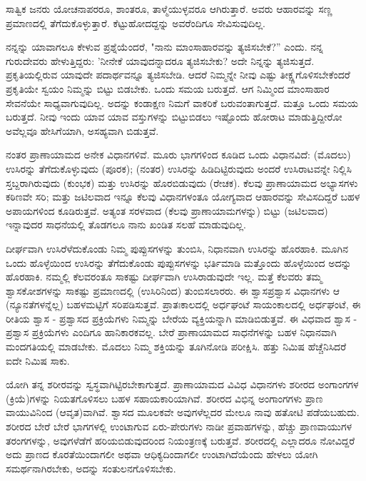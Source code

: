 ಸಾತ್ವಿಕ ಜನರು ಯೋಚನಾಪರರೂ, ಶಾಂತರೂ, ತಾಳ್ಮೆಯುಳ್ಳವರೂ ಆಗಿರುತ್ತಾರೆ. ಅವರು ಆಹಾರವನ್ನು ಸಣ್ಣ ಪ್ರಮಾಣದಲ್ಲಿ ತೆಗೆದುಕೊಳ್ಳುತ್ತಾರೆ. ಕೆಟ್ಟುಹೋದದ್ದನ್ನು ಅವರೆಂದಿಗೂ ಸೇವಿಸುವುದಿಲ್ಲ.

ನನ್ನನ್ನು ಯಾವಾಗಲೂ ಕೇಳುವ ಪ್ರಶ್ನೆಯೆಂದರೆ, "ನಾನು ಮಾಂಸಾಹಾರವನ್ನು ತ್ಯಜಿಸಬೇಕೆ?'' ಎಂದು. ನನ್ನ ಗುರುದೇವರು ಹೇಳುತ್ತಿದ್ದರು: 'ನೀನೇಕೆ ಯಾವುದನ್ನಾದರೂ ತ್ಯಜಿಸಬೇಕು? ಅದೇ ನಿನ್ನನ್ನು ತ್ಯಜಿಸುತ್ತದೆ. ಪ್ರಕೃತಿಯಲ್ಲಿರುವ ಯಾವುದೇ ಪದಾರ್ಥವನ್ನೂ ತ್ಯಜಿಸಬೇಡಿ. ಆದರೆ ನಿಮ್ಮನ್ನೇ ನೀವು ಎಷ್ಟು ತೀಕ್ಷ್ಣಗೊಳಿಸಬೇಕೆಂದರೆ ಪ್ರಕೃತಿಯೇ ಸ್ವಯಂ ನಿಮ್ಮನ್ನು ಬಿಟ್ಟು ಬಿಡಬೇಕು. ಒಂದು ಸಮಯ ಬರುತ್ತದೆ. ಆಗ ನಿಮ್ಮಿಂದ ಮಾಂಸಾಹಾರ ಸೇವನೆಯೇ ಸಾಧ್ಯವಾಗುವುದಿಲ್ಲ. ಅದನ್ನು ಕಂಡಾಕ್ಷಣ ನಿಮಗೆ ವಾಕರಿಕೆ ಬರುವಂತಾಗುತ್ತದೆ. ಮತ್ತೂ ಒಂದು ಸಮಯ ಬರುತ್ತದೆ. ನೀವು ಇಂದು ಯಾವ ಯಾವ ವಸ್ತುಗಳನ್ನು ಬಿಟ್ಟುಬಿಡಲು ಇಷ್ಟೊಂದು ಹೋರಾಟ ಮಾಡುತ್ತಿದ್ದೀರೋ ಅವೆಲ್ಲವೂ ಹೇಸಿಗೆಯಾಗಿ, ಅಸಹ್ಯವಾಗಿ ಬಿಡುತ್ತವೆ.

ನಂತರ ಪ್ರಾಣಾಯಾಮದ ಅನೇಕ ವಿಧಾನಗಳಿವೆ. ಮೂರು ಭಾಗಗಳಿಂದ ಕೂಡಿದ ಒಂದು ವಿಧಾನವಿದೆ: (ಮೊದಲು) ಉಸಿರನ್ನು ತೆಗೆದುಕೊಳ್ಳುವುದು (ಪೂರಕ); (ನಂತರ) ಉಸಿರನ್ನು ಹಿಡಿದಿಟ್ಟಿರುವುದು ಅಂದರೆ ಉಸಿರಾಟವನ್ನೇ ನಿಲ್ಲಿಸಿ ಸ್ತಬ್ದರಾಗಿರುವುದು (ಕುಂಭಕ) ಮತ್ತು ಉಸಿರನ್ನು ಹೊರಬಿಡುವುದು (ರೇಚಕ). ಕೆಲವು ಪ್ರಾಣಾಯಾಮದ ಅಭ್ಯಾಸಗಳು ಕಠಿಣವೇ ಸರಿ; ಮತ್ತು ಜಟಿಲವಾದ ಇನ್ನೂ ಕೆಲವು ವಿಧಾನಗಳಂತೂ ಯೋಗ್ಯವಾದ ಆಹಾರವನ್ನು ಸೇವಿಸದಿದ್ದರೆ ಬಹಳ ಅಪಾಯಗಳಿಂದ ಕೂಡಿರುತ್ತವೆ. ಅತ್ಯಂತ ಸರಳವಾದ (ಕೆಲವು ಪ್ರಾಣಾಯಾಮಗಳನ್ನು) ಬಿಟ್ಟು (ಜಟಿಲವಾದ) ಇನ್ನಾವುದರ ಸಾಧನೆಯಲ್ಲಿ ತೊಡಗಲೂ ನಾನು ಖಂಡಿತ ಸಲಹೆ ಮಾಡುವುದಿಲ್ಲ.

ದೀರ್ಘವಾಗಿ ಉಸಿರೆಳೆದುಕೊಂಡು ನಿಮ್ಮ ಪುಪ್ಪುಸಗಳನ್ನು ತುಂಬಿಸಿ, ನಿಧಾನವಾಗಿ ಉಸಿರನ್ನು ಹೊರಹಾಕಿ. ಮೂಗಿನ ಒಂದು ಹೊಳ್ಳೆಯಿಂದ ಉಸಿರನ್ನು ತೆಗೆದುಕೊಂಡು ಪುಪ್ಪುಸಗಳನ್ನು ಭರ್ತಿಮಾಡಿ ಮತ್ತೊಂದು ಹೊಳ್ಳೆಯಿಂದ ಅದನ್ನು ಹೊರಹಾಕಿ. ನಮ್ಮಲ್ಲಿ ಕೆಲವರಂತೂ ಸಾಕಷ್ಟು ದೀರ್ಘವಾಗಿ ಉಸಿರಾಡುವುದೇ ಇಲ್ಲ. ಮತ್ತೆ ಕೆಲವರು ತಮ್ಮ ಶ್ವಾಸಕೋಶಗಳನ್ನು ಸಾಕಷ್ಟು ಪ್ರಮಾಣದಲ್ಲಿ (ಉಸಿರಿನಿಂದ) ತುಂಬಿಸಲಾರರು. ಈ ಶ್ವಾಸಪ್ರಶ್ವಾಸ ವಿಧಾನಗಳು ಆ (ನ್ಯೂನತೆಗಳನ್ನೆಲ್ಲ) ಬಹಳಮಟ್ಟಿಗೆ ಸರಿಪಡಿಸುತ್ತವೆ. ಪ್ರಾತಃಕಾಲದಲ್ಲಿ ಅರ್ಧಘಂಟೆ ಸಾಯಂಕಾಲದಲ್ಲಿ ಅರ್ಧಘಂಟೆ, ಈ ರೀತಿಯ ಶ್ವಾಸ - ಪ್ರಶ್ವಾಸದ ಪ್ರಕ್ರಿಯೆಗಳು ನಿಮ್ಮನ್ನು ಬೇರೆಯ ವ್ಯಕ್ತಿಯನ್ನಾಗಿ ಮಾಡಿಬಿಡುತ್ತವೆ. ಈ ವಿಧವಾದ ಶ್ವಾಸ - ಪ್ರಶ್ವಾಸ ಪ್ರಕ್ರಿಯೆಗಳು ಎಂದಿಗೂ ಹಾನಿಕಾರಕವಲ್ಲ. ಬೇರೆ ಪ್ರಾಣಾಯಾಮದ ಸಾಧನೆಗಳನ್ನು ಬಹಳ ನಿಧಾನವಾಗಿ ಮಂದಗತಿಯಲ್ಲಿ ಮಾಡಬೇಕು. ಮೊದಲು ನಿಮ್ಮ ಶಕ್ತಿಯನ್ನು ತೂಗಿನೋಡಿ ಪರೀಕ್ಷಿಸಿ. ಹತ್ತು ನಿಮಿಷ ಹೆಚ್ಚೆನಿಸಿದರೆ ಐದೇ ನಿಮಿಷ ಸಾಕು.

ಯೋಗಿ ತನ್ನ ಶರೀರವನ್ನು ಸ್ವಸ್ಥವಾಗಿಟ್ಟಿರಬೇಕಾಗುತ್ತದೆ. ಪ್ರಾಣಾಯಾಮದ ವಿವಿಧ ವಿಧಾನಗಳು ಶರೀರದ ಅಂಗಾಂಗಗಳ (ಕ್ರಿಯೆ)ಗಳನ್ನು ನಿಯತಗೊಳಿಸಲು ಬಹಳ ಸಹಾಯಕಾರಿಯಾಗಿವೆ. ಶರೀರದ ವಿಭಿನ್ನ ಅಂಗಾಂಗಗಳು ಪ್ರಾಣ ವಾಯುವಿನಿಂದ (ಆವೃತ)ವಾಗಿವೆ. ಶ್ವಾಸದ ಮೂಲಕವೇ ಅವುಗಳೆಲ್ಲದರ ಮೇಲೂ ನಾವು ಹತೋಟಿ ಪಡೆಯಬಹುದು. ಶರೀರದ ಬೇರೆ ಬೇರೆ ಭಾಗಗಳಲ್ಲಿ ಉಂಟಾಗುವ ಏರು-ಪೇರುಗಳು ನಾಡೀ ಪ್ರವಾಹಗಳನ್ನು, ಹೆಚ್ಚು ಪ್ರಾಣವಾಯುಗಳ ತರಂಗಗಳನ್ನು, ಅವುಗಳೆಡೆಗೆ ಹರಿಯಬಿಡುವುದರಿಂದ ನಿಯಂತ್ರಣಕ್ಕೆ ಬರುತ್ತವೆ. ಶರೀರದಲ್ಲಿ ಎಲ್ಲಾದರೂ ನೋವಿದ್ದರೆ ಅದು ಪ್ರಾಣದ ಕೊರತೆಯಿಂದಾಗಲೀ ಅಥವಾ ಆಧಿಕ್ಯದಿಂದಾಗಲೀ ಉಂಟಾಗಿದೆಯೆಂದು ಹೇಳಲು ಯೋಗಿ ಸಮರ್ಥನಾಗಿರಬೇಕು, ಅದನ್ನು ಸಂತುಲನಗೊಳಿಸಬೇಕು.

